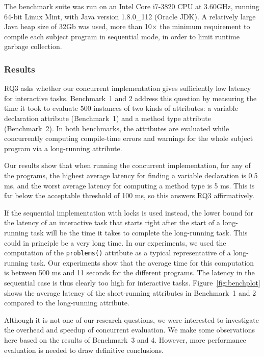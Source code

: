 {The benchmark suite was run on an Intel Core i7-3820 CPU at 3.60GHz,
running 64-bit Linux Mint, with Java version 1.8.0\_112 (Oracle JDK).
A relatively large Java heap size of 32Gb was used,
more than 10$\times$ the minimum requirement to compile each subject program in sequential mode,
in order to limit runtime garbage collection.

\subsubsection{Results}
\label{results}

RQ3 asks whether our concurrent
implementation gives sufficiently low latency for interactive tasks.
Benchmark~1 and 2 address this question
by measuring the time it took to evaluate 500 instances of two kinds of attributes: a variable
declaration attribute (Benchmark~1) and a method type attribute (Benchmark~2).
In both benchmarks, the attributes are evaluated while concurrently computing
compile-time errors and warnings for the whole subject program via a
long-running attribute.

Our results show that when running the concurrent implementation, for any of
the \subjectprogramcount{} programs, the highest average latency for finding a variable declaration
is 0.5 ms, and the worst average latency for computing a method type is 5 ms.
This is far below the acceptable threshold of 100 ms, so this answers RQ3
affirmatively.

If the sequential implementation with locks is used instead, the lower bound
for the latency of an interactive task that starts right after the start of a
long-running task will be the time it takes to complete the long-running task.
This could in principle be a very long time. In our experiments, we used the
computation of the \verb'problems()' attribute as a typical representative of a
long-running task.  Our experiments show that the average time for this
computation is between 500 ms and 11 seconds for the \subjectprogramcount{} different programs. The
latency in the sequential case is thus clearly too high for interactive tasks.
%
Figure~\ref{fig:benchplot} shows the average
latency of the short-running attributes in Benchmark~1 and 2 compared to the long-running
attribute.

Although it is not one of our research questions, we were interested to investigate the
overhead and speedup of concurrent evaluation.  We make some observations here based on
the results of Benchmark~3 and 4. However, more performance evaluation is needed to draw
definitive conclusions.

}

